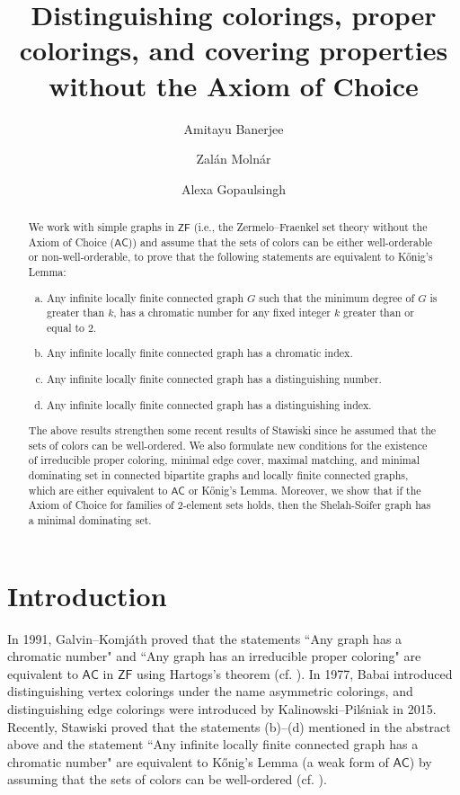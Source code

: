 \documentclass[12pt,reqno,a4paper]{amsart}
\title[Distinguishing colorings, proper colorings, and covering properties without AC]{Distinguishing colorings, proper colorings, and covering properties without the Axiom of Choice}
\author{Amitayu Banerjee}
\author{Zal\'{a}n Moln\'{a}r}
\author{Alexa Gopaulsingh}
\date{}
\theoremstyle{definition}
\begin{document}
	\begin{abstract}
		We work with simple graphs in $\mathsf{ZF}$ (i.e., the Zermelo–Fraenkel set theory without the Axiom of Choice ($\mathsf{AC}$)) and 
		assume that the 
		sets of colors can be either well-orderable or non-well-orderable,
		to prove that the following statements are equivalent to K\H{o}nig’s Lemma:
		\begin{enumerate}[(a)]
			\item Any infinite locally finite connected graph $G$ such that the minimum degree of $G$ is greater than $k$, has a chromatic number for any fixed integer $k$ greater than or equal to 2.
			\item Any infinite locally finite connected graph has a chromatic index.
			\item Any infinite locally finite connected graph has a distinguishing number.
			\item Any infinite locally finite connected graph has a distinguishing index.
		\end{enumerate}
		The above results strengthen some recent results of Stawiski since he assumed that the 
		sets of colors can be well-ordered. 
		We also formulate new conditions for the existence of irreducible proper coloring, minimal edge cover, maximal matching, and minimal dominating set in connected bipartite graphs and locally finite connected graphs, which are either equivalent to $\mathsf{AC}$ or K\H{o}nig’s Lemma. Moreover, we show that if the Axiom of Choice for families of 2-element sets holds, then the Shelah-Soifer graph has a minimal dominating set.
	\end{abstract}
	\maketitle
	\section{Introduction}
	In 1991, Galvin--Komj\'{a}th proved that the statements ``Any graph has a chromatic number" and ``Any graph has an irreducible proper coloring" are equivalent to $\mathsf{AC}$ in $\mathsf{ZF}$ using Hartogs's theorem (cf. \cite{GK1991}). 
	In 1977, Babai \cite{Bab1977} introduced distinguishing vertex colorings under the name asymmetric colorings, and distinguishing edge colorings were introduced by Kalinowski--Pil\'{s}niak \cite{KP2015} in 2015.
	Recently, Stawiski \cite{Sta2023} proved that the statements (b)--(d) mentioned in the abstract above and the statement ``Any infinite locally finite connected graph has a chromatic number" are equivalent to K\H{o}nig's Lemma (a weak form of $\mathsf{AC}$) by assuming that the 
	sets of colors can be well-ordered (cf. \cite[Lemma 3.3 and section 2]{Sta2023}).
	
\end{document}
